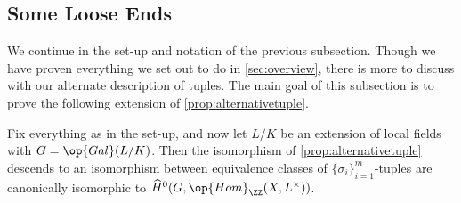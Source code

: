 \documentclass{article}
\numberwithin{equation}{section}
\begin{document}
\subsection{Some Loose Ends}
We continue in the set-up and notation of the previous subsection. Though we have proven everything we set out to do in \autoref{sec:overview}, there is more to discuss with our alternate description of tuples. The main goal of this subsection is to prove the following extension of \autoref{prop:alternativetuple}.
\begin{proposition}
	Fix everything as in the set-up, and now let $L/K$ be an extension of local fields with $G=\op{Gal}(L/K)$. Then the isomorphism of \autoref{prop:alternativetuple} descends to an isomorphism between equivalence classes of $\{\sigma_i\}_{i=1}^m$-tuples are canonically isomorphic to $\widehat H^0(G,\op{Hom}_\ZZ(X,L^\times))$.
\end{proposition}
\end{document}
